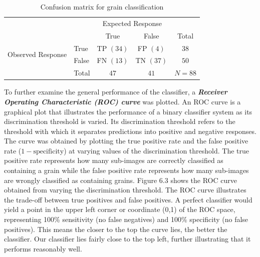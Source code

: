 \begin{table}[ht!]
\begin{center}
    \begin{tabular}{l|l|c|c|c}
    \multicolumn{2}{c}{}&\multicolumn{2}{c}{Expected Response}&\\
    \cline{3-4}
    \multicolumn{2}{c|}{}&True&False&\multicolumn{1}{c}{Total}\\
    \cline{2-4}
    \multirow{2}{*}{Observed Response}& True & \cellcolor{green!25}TP $(34)$ & FP $(4)$ & $38$\\
    \cline{2-4}
    & False & FN $(13)$ & \cellcolor{green!25}TN $(37)$ & $50$\\
    \cline{2-4}
    \multicolumn{1}{c}{} & \multicolumn{1}{c}{Total} & \multicolumn{1}{c}{$47$} & \multicolumn{1}{c}{$41$} & \multicolumn{1}{c}{$N = 88$}\\
    \end{tabular}
\end{center}
\caption{Confusion matrix for grain classification}
\end{table}
To further examine the general performance of the classifier, a \textit{\textbf{Receiver Operating Characteristic (ROC) curve}} was plotted. An ROC curve is a graphical plot that illustrates the performance of a binary classifier system as its discrimination threshold is varied. Its discrimination threshold refers to the threshold with which it separates predictions into positive and negative responses. The curve was obtained by plotting the true positive rate and the false positive rate ($1 - \text{specificity}$) at varying values of the discrimination threshold. The true positive rate represents how many sub-images are correctly classified as containing a grain while the false positive rate represents how many sub-images are wrongly classified as containing grains. Figure 6.3 shows the ROC curve obtained from varying the discrimination threshold. The ROC curve illustrates the trade-off between true positives and false positives. A perfect classifier would yield a point in the upper left corner or coordinate (0,1) of the ROC space, representing 100\% sensitivity (no false negatives) and 100\% specificity (no false positives). This means the closer to the top the curve lies, the better the classifier. Our classifier lies fairly close to the top left, further illustrating that it performs reasonably well.
